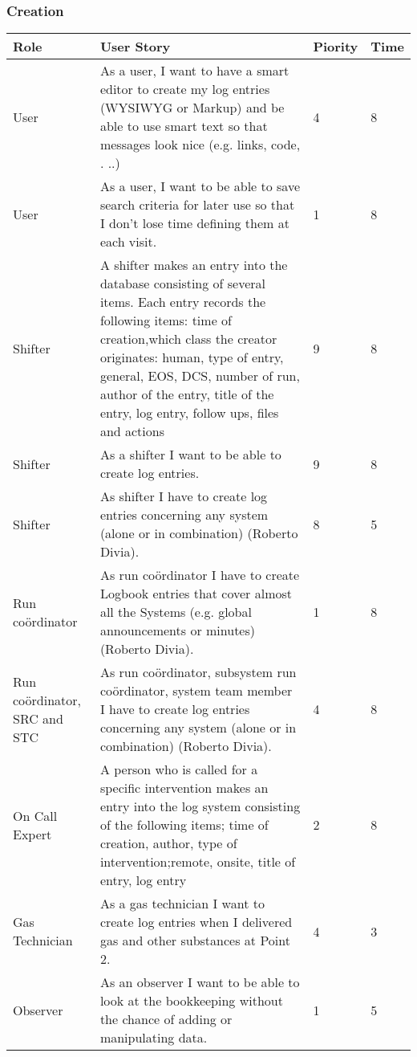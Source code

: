 \subsubsection{Creation}
\begin{longtable}{ | p{2cm} | p{8cm} | p{1.5cm} | l |}
\hline
Role & User Story & Piority & Time \\ \hline
User &  As a user, I want to have a smart editor to create my log entries
(WYSIWYG or Markup) and be able to use smart text so that messages look nice (e.g. links, code, . ..)& 4 & 8 \\ \hline
User &  As a user, I want to be able to save search criteria for later use so that I don’t lose time defining them at each visit. & 1 & 8 \\ \hline
Shifter &  A shifter makes an entry into the database consisting of several items. Each entry records the following items: time of creation,which class the creator originates: human, type of entry, general, EOS, DCS, number of run, author of the entry, title of the entry, log entry, follow ups, files and actions & 9 & 8 \\ \hline
Shifter &  As a shifter I want to be able to create log entries. & 9 & 8 \\ \hline
Shifter & As shifter I have to create log entries concerning any system (alone or in combination) (Roberto Divia). & 8 & 5 \\ \hline
Run coördinator & As run coördinator I have to create Logbook entries that cover almost all the Systems (e.g. global announcements or minutes) (Roberto Divia). & 1 & 8 \\ \hline
Run coördinator, SRC and STC & As run coördinator, subsystem run coördinator, system team member I have to create log entries concerning any system (alone or in combination) (Roberto Divia). & 4 & 8 \\ \hline
\newpage
\hline
On Call Expert & A person who is called for a specific intervention makes an entry into the log system consisting of the following items; time of creation, author, type of intervention;remote, onsite, title of entry, log entry & 2 & 8 \\ \hline
Gas Technician & As a gas technician I want to create log entries when I delivered gas
and other substances at Point 2. & 4 & 3 \\ \hline
Observer &  As an observer I want to be able to look at the bookkeeping without
the chance of adding or manipulating data. & 1 & 5 \\ \hline 
\end{longtable}

